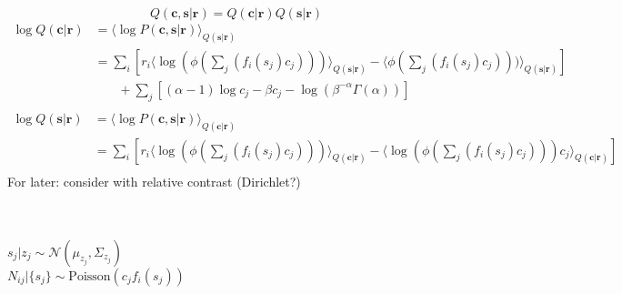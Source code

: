 \documentclass[12pt]{article}
\begin{document}
\begin{equation}
Q(\mathbf{c, s|r}) = Q(\mathbf{c|r}) Q(\mathbf{s|r})
\end{equation}
\begin{equation}
\begin{aligned}
\log Q(\mathbf{c|r}) &= \langle \log P(\mathbf{c, s|r}) \rangle_{Q(\mathbf{s|r})}\\
&= \sum_i [r_i \langle \log(\phi(\sum_j(f_i(s_j)c_j))) \rangle_{Q(\mathbf{s|r})} - \langle \phi(\sum_j(f_i(s_j)c_j))) \rangle_{Q(\mathbf{s|r})}]\\
& \phantom{{}=1}+ \sum_j [(\alpha - 1) \log c_j - \beta c_j - \log (\beta^{- \alpha} \Gamma (\alpha))]\\
\end{aligned}
\end{equation}
\begin{equation}
\begin{aligned}
\log Q(\mathbf{s|r}) &= \langle \log P(\mathbf{c, s|r}) \rangle_{Q(\mathbf{c|r})}\\
&= \sum_i [r_i \langle \log(\phi(\sum_j(f_i(s_j)c_j))) \rangle_{Q(\mathbf{c|r})} - \langle \log(\phi(\sum_j(f_i(s_j)c_j))) c_j \rangle_{Q(\mathbf{c|r})}]\\
\end{aligned}
\end{equation}
For later: consider with relative contrast (Dirichlet?)\\
\\
\\
$s_j|z_j \sim \mathcal{N}(\mu_{z_j}, \Sigma_{z_j})$\\
$N_{ij}|\{s_j\}  \sim \text{Poisson}(c_j f_i(s_j))$\\
\end{document}
